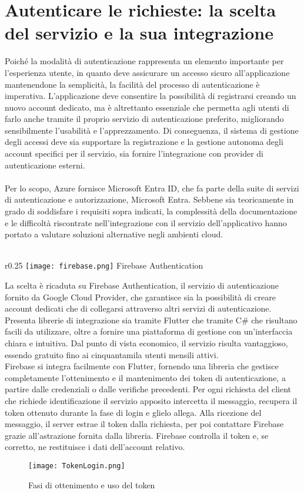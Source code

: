
\section{Autenticare le richieste: la scelta del servizio e la sua integrazione}


Poiché la modalità di autenticazione rappresenta
un elemento importante per l'esperienza utente,
in quanto deve assicurare un accesso sicuro all'applicazione mantenendone la semplicità,
la facilità del processo di autenticazione è imperativa.
L'applicazione deve consentire la possibilità di registrarsi
creando un nuovo account dedicato,
ma è altrettanto essenziale che permetta agli utenti di farlo anche
tramite il proprio servizio di autenticazione preferito,
migliorando sensibilmente l'usabilità e l'apprezzamento.
Di conseguenza, il sistema di gestione degli accessi deve 
sia supportare la registrazione e la gestione autonoma 
degli account specifici per il servizio,
sia fornire l'integrazione con provider di autenticazione esterni.\\
\\
Per lo scopo, Azure fornisce Microsoft Entra ID,
che fa parte della suite di servizi di autenticazione e autorizzazione, Microsoft Entra.
Sebbene sia teoricamente in grado di soddisfare i requisiti sopra indicati,
la complessità della documentazione e le difficoltà
riscontrate nell'integrazione con il servizio dell'applicativo
hanno portato a valutare soluzioni alternative negli ambienti cloud.\\
\\
\begin{wrapfigure}{r}{0.25\textwidth}
    \centering
    \texttt{[image: firebase.png]}
    Firebase Authentication
\end{wrapfigure}
La scelta è ricaduta su Firebase Authentication,
il servizio di autenticazione fornito da Google Cloud Provider,
che garantisce sia la possibilità di creare account dedicati
che di collegarsi attraverso altri servizi di autenticazione.
Presenta librerie di integrazione sia tramite Flutter
che tramite C\# che risultano facili da utilizzare,
oltre a fornire una piattaforma di gestione con un'interfaccia chiara e intuitiva.
Dal punto di vista economico, il servizio risulta vantaggioso,
essendo gratuito fino ai cinquantamila utenti mensili attivi.\\
\clearpage
Firebase si integra facilmente con Flutter,
fornendo una libreria che gestisce completamente 
l'ottenimento e il mantenimento dei token di autenticazione,
a partire dalle credenziali o dalle verifiche precedenti.
Per ogni richiesta del client che richiede identificazione
il servizio apposito intercetta il messaggio,
recupera il token ottenuto durante la fase di login e glielo allega.
Alla ricezione del messaggio, il server estrae il token dalla richiesta,
per poi contattare Firebase grazie all'astrazione fornita dalla libreria.
Firebase controlla il token e, se corretto,
ne restituisce i dati dell'account relativo.\\
\begin{figure}[htpb]
    \centering
    \texttt{[image: TokenLogin.png]}
    \caption{Fasi di ottenimento e uso del token}
\end{figure}


